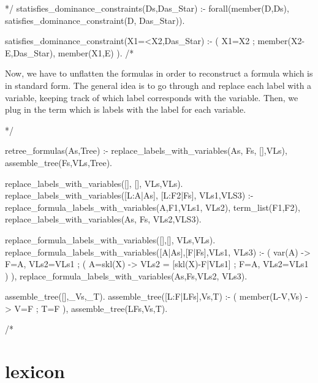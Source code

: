 \documentclass{book}[9pt]
\newenvironment{code}%
{\small \verbatim}%
{\endverbatim \large}
\begin{document}
\begin{code}
*/
statisfies_dominance_constraints(Ds,Das_Star) :-
        forall(member(D,Ds), satisfies_dominance_constraint(D, Das_Star)).

satisfies_dominance_constraint(X1=<X2,Das_Star) :-
        (   X1=X2
        ;   member(X2-E,Das_Star),
            member(X1,E)
        ).
/*
\end{code}

Now, we have to unflatten the formulas in order to reconstruct a
formula which is in standard form.  The general idea is to go through
and replace each label with a variable, keeping track of which label
corresponds with the variable.  Then, we plug in the term which is
labels with the label for each variable.

\begin{code}
*/

retree_formulas(As,Tree) :-
        replace_labels_with_variables(As, Fs, [],VLs),
        assemble_tree(Fs,VLs,Tree).

replace_labels_with_variables([], [], VLs,VLs).
replace_labels_with_variables([L:A|As], [L:F2|Fs], VLs1,VLS3) :-
        replace_formula_labels_with_variables(A,F1,VLs1, VLs2),
        term_list(F1,F2),
        replace_labels_with_variables(As, Fs, VLs2,VLS3).

replace_formula_labels_with_variables([],[], VLs,VLs).
replace_formula_labels_with_variables([A|As],[F|Fs],VLs1, VLs3) :-
        (   var(A)
        ->  F=A,
            VLs2=VLs1
        ;   (   A=skl(X)
            ->  VLs2 = [skl(X)-F|VLs1]
            ;   F=A,
                VLs2=VLs1
            )
        ),
        replace_formula_labels_with_variables(As,Fs,VLs2, VLs3).

assemble_tree([],_Vs,_T).
assemble_tree([L:F|LFs],Vs,T) :-
        (   member(L-V,Vs)
        ->  V=F
        ;   T=F  %
        ),
        assemble_tree(LFs,Vs,T).

/*
\end{code}

\section{lexicon}
\end{document}
